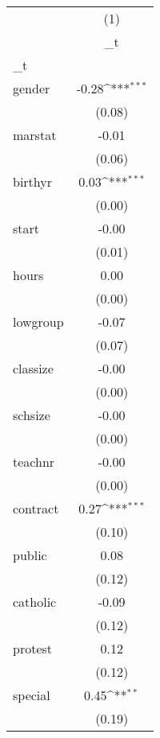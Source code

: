 \documentclass{article}
\begin{document}
{
\def\sym#1{\ifmmode^{#1}\else\(^{#1}\)\fi}
\begin{tabular}{l*{1}{c}}
\hline\hline
            &\multicolumn{1}{c}{(1)}\\
            &\multicolumn{1}{c}{\_t}\\
\hline
\_t          &                     \\
gender      &       -0.28\sym{***}\\
            &      (0.08)         \\
[1em]
marstat     &       -0.01         \\
            &      (0.06)         \\
[1em]
birthyr     &        0.03\sym{***}\\
            &      (0.00)         \\
[1em]
start       &       -0.00         \\
            &      (0.01)         \\
[1em]
hours       &        0.00         \\
            &      (0.00)         \\
[1em]
lowgroup    &       -0.07         \\
            &      (0.07)         \\
[1em]
classize    &       -0.00         \\
            &      (0.00)         \\
[1em]
schsize     &       -0.00         \\
            &      (0.00)         \\
[1em]
teachnr     &       -0.00         \\
            &      (0.00)         \\
[1em]
contract    &        0.27\sym{***}\\
            &      (0.10)         \\
[1em]
public      &        0.08         \\
            &      (0.12)         \\
[1em]
catholic    &       -0.09         \\
            &      (0.12)         \\
[1em]
protest     &        0.12         \\
            &      (0.12)         \\
[1em]
special     &        0.45\sym{**} \\
            &      (0.19)         \\

\end{tabular}}
\end{document}
